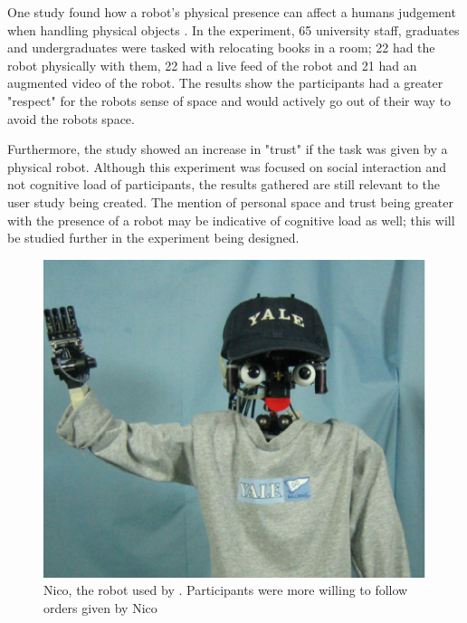 \documentclass[conference]{IEEEtran}
\begin{document}
One study found how a robot's physical presence can affect a humans judgement when handling physical objects \cite{bainbridge2011benefits}. In the experiment, 65 university staff, graduates and undergraduates were tasked with relocating books in a room; 22 had the robot physically with them, 22 had a live feed of the robot and 21 had an augmented video of the robot. The results show the participants had a greater "respect" for the robots sense of space and would actively go out of their way to avoid the robots space. \newline

Furthermore, the study showed an increase in "trust" if the task was given by a physical robot. Although this experiment was focused on social interaction and not cognitive load of participants, the results gathered are still relevant to the user study being created. The mention of personal space and trust being greater with the presence of a robot may be indicative of cognitive load as well; this will be studied further in the experiment being designed.
\begin{figure}[h]
    \centering
    \includegraphics[width=0.95\linewidth]{figures/Nico.PNG}
    \caption{\label{fig:my_label}Nico, the robot used by \citet{bainbridge2011benefits}. Participants were more willing to follow orders given by Nico}
\end{figure} 
\newline

\end{document}
